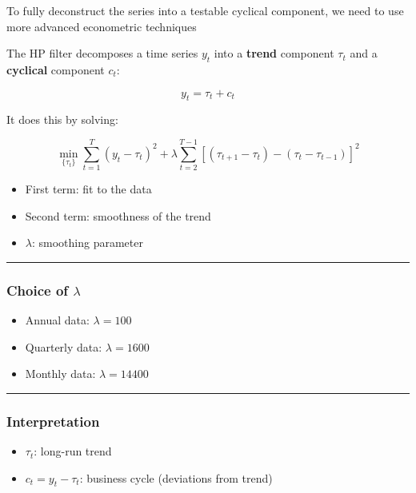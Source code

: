 \documentclass[
]{article}
\providecommand{\tightlist}{%
  \setlength{\itemsep}{0pt}\setlength{\parskip}{0pt}}
\begin{document}
To fully deconstruct the series into a testable cyclical component, we
need to use more advanced econometric techniques

The HP filter decomposes a time series \(y_t\) into a \textbf{trend}
component \(\tau_t\) and a \textbf{cyclical} component \(c_t\):

\[
y_t = \tau_t + c_t
\]

It does this by solving:

\[
\min_{\{\tau_t\}} \sum_{t=1}^{T} (y_t - \tau_t)^2 
+ \lambda \sum_{t=2}^{T-1} \left[ (\tau_{t+1} - \tau_t) - (\tau_t - \tau_{t-1}) \right]^2
\]

\begin{itemize}
\tightlist
\item
  First term: fit to the data\\
\item
  Second term: smoothness of the trend\\
\item
  \(\lambda\): smoothing parameter
\end{itemize}

\begin{center}\rule{0.5\linewidth}{0.5pt}\end{center}

\subsubsection{\texorpdfstring{Choice of
\(\lambda\)}{Choice of \textbackslash lambda}}\label{choice-of-lambda}

\begin{itemize}
\tightlist
\item
  Annual data: \(\lambda = 100\)\\
\item
  Quarterly data: \(\lambda = 1600\)\\
\item
  Monthly data: \(\lambda = 14400\)
\end{itemize}

\begin{center}\rule{0.5\linewidth}{0.5pt}\end{center}

\subsubsection{Interpretation}\label{interpretation}

\begin{itemize}
\tightlist
\item
  \(\tau_t\): long-run trend\\
\item
  \(c_t = y_t - \tau_t\): business cycle (deviations from trend)
\end{itemize}
\end{document}
